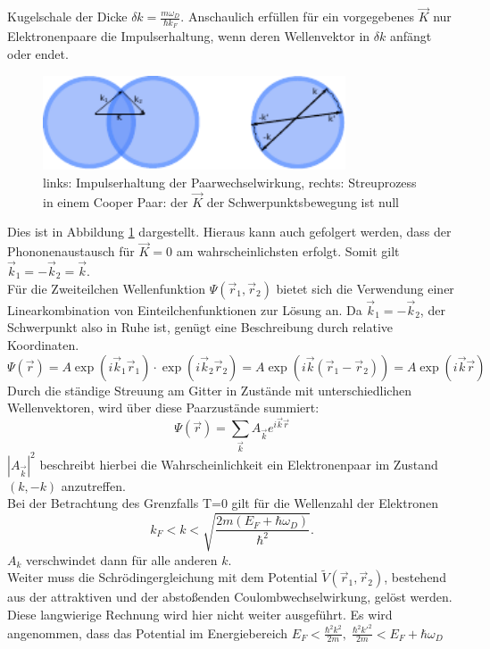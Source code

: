 Kugelschale der Dicke $\delta k = \frac{m \omega_D}{\hbar k_F}$. Anschaulich 
erfüllen für ein vorgegebenes $\vec{K}$ nur Elektronenpaare die Impulserhaltung,
wenn deren Wellenvektor in $\delta k$ anfängt oder endet. 
\begin{figure}[h]
	\centering
	\includegraphics[width=0.8\textwidth]{Abb/cooperstreu.pdf}
	\caption{links: Impulserhaltung der Paarwechselwirkung, rechts: Streuprozess in
			 einem Cooper Paar: der $\vec{K}$ der Schwerpunktsbewegung ist null
			 \cite{hunklinger}}
	\label{streucooper}
\end{figure}
Dies ist in Abbildung \ref{streucooper} dargestellt. Hieraus kann auch gefolgert 
werden, dass der Phononenaustausch für $\vec{K}=0$ am wahrscheinlichsten erfolgt.
Somit gilt $\vec{k}_1 = - \vec{k}_2 = \vec{k}$.\\
Für die Zweiteilchen Wellenfunktion $\Psi (\vec{r}_1,\vec{r}_2)$ bietet sich die 
Verwendung einer Linearkombination von Einteilchenfunktionen zur Lösung an. Da 
$\vec{k}_1 = - \vec{k}_2$, der Schwerpunkt also in Ruhe ist, genügt eine 
Beschreibung durch relative Koordinaten. 
\[
	\Psi ( \vec{r} ) = A \exp ( i \vec{k}_1 \vec{r}_1 ) \cdot \exp( i \vec{k}_2
					   \vec{r}_2) 
					 = A \exp( i \vec{k} ( \vec{r}_1 - \vec{r}_2 ))
					 = A \exp(i \vec{k} \vec{r} )
\]
Durch die ständige Streuung am Gitter in Zustände mit unterschiedlichen 
Wellenvektoren, wird über diese Paarzustände summiert:
\[
	\Psi (\vec{r}) = \sum_{\vec{k}} A_{\vec{k}} e^{i \vec{k} \vec{r}}
\]
$| A_{\vec{k}} |^2$ beschreibt hierbei die Wahrscheinlichkeit ein Elektronenpaar
im Zustand $(k,-k)$ anzutreffen.\\
Bei der Betrachtung des Grenzfalls T=0 gilt für die Wellenzahl der Elektronen 
\[
	\displaystyle k_F < k < \sqrt{\frac{2m(E_F + \hbar \omega_D)}{\hbar^2}}.
\]
$A_k$ verschwindet dann für alle anderen $k$.\\
Weiter muss die Schrödingergleichung mit dem Potential $\tilde{V}(\vec{r}_1,
\vec{r}_2)$, bestehend aus der attraktiven und der abstoßenden 
Coulombwechselwirkung, gelöst werden. Diese langwierige Rechnung wird hier nicht 
weiter ausgeführt. Es wird angenommen, dass das Potential im Energiebereich
$E_F < \frac{\hbar^2 k^2}{2m}, \; \frac{\hbar^2 k'^2}{2m} < E_F + \hbar \omega_D$

